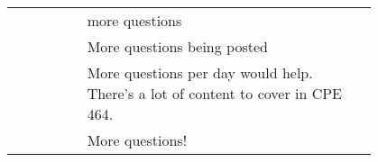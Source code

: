 {\begin{longtable}{R|p{0.8\linewidth}}
		& more questions                                                                                                                                                                                                                                                                                                                                                                                                                                                                                                                                                                                                                                                                                                                                   \\
		& More questions being posted                                                                                                                                                                                                                                                                                                                                                                                                                                                                                                                                                                                                                                                                                                                      \\
		& More questions per day would help. There's a lot of content to cover in CPE 464.                                                                                                                                                                                                                                                                                                                                                                                                                                                                                                                                                                                                                                                                 \\
		& More questions!                                                                                                                                                                                                                                                                                                                                                                                                                                                                                                                                                                                                                                                                                                                                  \\

\end{longtable}}
